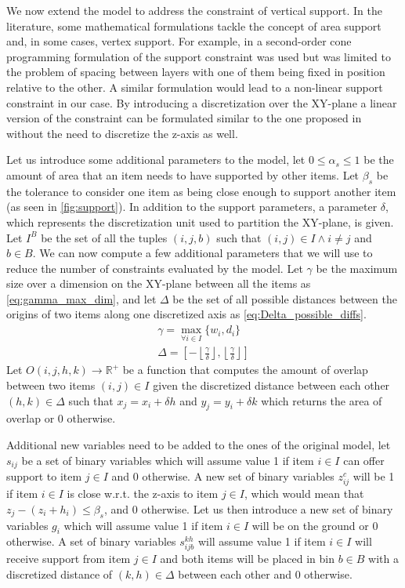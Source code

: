 We now extend the model to address the constraint of vertical support.
In the literature, some mathematical formulations tackle the concept of area support and, in some cases, vertex support. For example, in \cite{GZARA20201062} a second-order cone programming formulation of the support constraint was used but was limited to the problem of spacing between layers with one of them being fixed in position relative to the other. A similar formulation would lead to a non-linear support constraint in our case.
By introducing a discretization over the XY-plane a linear version of the constraint can be formulated similar to the one proposed in \cite{kurpel2020exact} without the need to discretize the z-axis as well.

Let us introduce some additional parameters to the model, let $0 \le \alpha_s \le 1$ be the amount of area that an item needs to have supported by other items. Let $\beta_s$ be the tolerance to consider one item as being close enough to support another item (as seen in \cref{fig:support}).
In addition to the support parameters, a parameter $\delta$, which represents the discretization unit used to partition the XY-plane, is given. Let $I^B$ be the set of all the tuples $(i, j, b)$ such that $(i,j) \in I \land i \neq j$ and $b \in B$.
We can now compute a few additional parameters that we will use to reduce the number of constraints evaluated by the model. Let $\gamma$ be the maximum size over a dimension on the XY-plane between all the items as \cref{eq:gamma_max_dim}, and let $\Delta$ be the set of all possible distances between the origins of two items along one discretized axis as \cref{eq:Delta_possible_diffs}.
\begin{align}
    \gamma = \max_{\forall i \in I}\{ w_i, d_i \} \label{eq:gamma_max_dim} \\
    \Delta =  \left[ - \left\lfloor \frac{ \gamma }{\delta} \right\rfloor, \left\lfloor \frac{ \gamma }{\delta} \right\rfloor \right] \label{eq:Delta_possible_diffs}
\end{align}
Let $O(i, j, h, k) \rightarrow \mathbb{R}^+$ be a function that computes the amount of overlap between two items $(i,j) \in I$ given the discretized distance between each other $(h, k) \in \Delta$ such that $x_j = x_i + \delta h$ and $y_j = y_i + \delta k$ which returns the area of overlap or 0 otherwise.

Additional new variables need to be added to the ones of the original model, let $s_{ij}$ be a set of binary variables which will assume value 1 if item $i \in I$ can offer support to item $j \in I$ and 0 otherwise. A new set of binary variables $z^c_{ij}$ will be 1 if item $i \in I$ is close w.r.t. the z-axis to item $j \in I$, which would mean that $z_j - (z_i + h_i) \le \beta_s$, and 0 otherwise.
Let us then introduce a new set of binary variables $g_i$ which will assume value 1 if item $i \in I$ will be on the ground or 0 otherwise. A set of binary variables $s^{kh}_{i j b}$ will assume value 1 if item $i \in I$ will receive support from item $j \in I$ and both items will be placed in bin $b \in B$ with a discretized distance of $(k, h) \in \Delta$ between each other and 0 otherwise.


